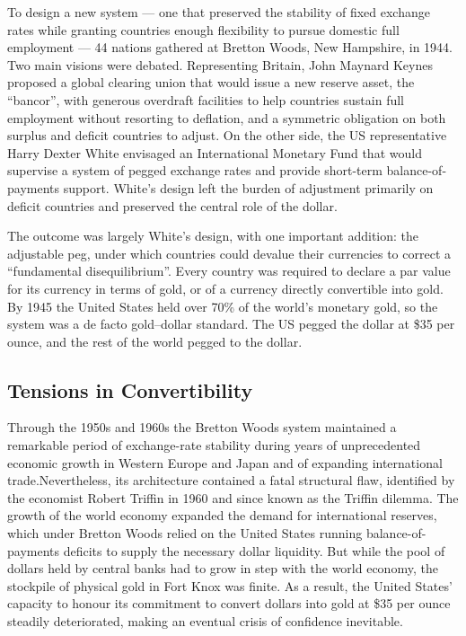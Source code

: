 To design a new system --- one that preserved the stability of fixed exchange rates while granting countries enough flexibility to pursue domestic full employment --- 44 nations gathered at Bretton Woods, New Hampshire, in 1944. Two main visions were debated. Representing Britain, John Maynard Keynes proposed a global clearing union that would issue a new reserve asset, the ``bancor'', with generous overdraft facilities to help countries sustain full employment without resorting to deflation, and a symmetric obligation on both surplus and deficit countries to adjust. On the other side, the US representative Harry Dexter White envisaged an International Monetary Fund that would supervise a system of pegged exchange rates and provide short-term balance-of-payments support. White's design left the burden of adjustment primarily on deficit countries and preserved the central role of the dollar.

The outcome was largely White's design, with one important addition: the adjustable peg, under which countries could devalue their currencies to correct a ``fundamental disequilibrium''. Every country was required to declare a par value for its currency in terms of gold, or of a currency directly convertible into gold. By 1945 the United States held over 70\% of the world's monetary gold, so the system was a de facto gold–dollar standard. The US pegged the dollar at \$35 per ounce, and the rest of the world pegged to the dollar.
\subsection{Tensions in Convertibility}
Through the 1950s and 1960s the Bretton Woods system maintained a remarkable period of exchange-rate stability during years of unprecedented economic growth in Western Europe and Japan and of expanding international trade.Nevertheless, its architecture contained a fatal structural flaw, identified by the economist Robert Triffin in 1960 and since known as the Triffin dilemma. The growth of the world economy expanded the demand for international reserves, which under Bretton Woods relied on the United States running balance-of-payments deficits to supply the necessary dollar liquidity. But while the pool of dollars held by central banks had to grow in step with the world economy, the stockpile of physical gold in Fort Knox was finite. As a result, the United States' capacity to honour its commitment to convert dollars into gold at \$35 per ounce steadily deteriorated, making an eventual crisis of confidence inevitable.

